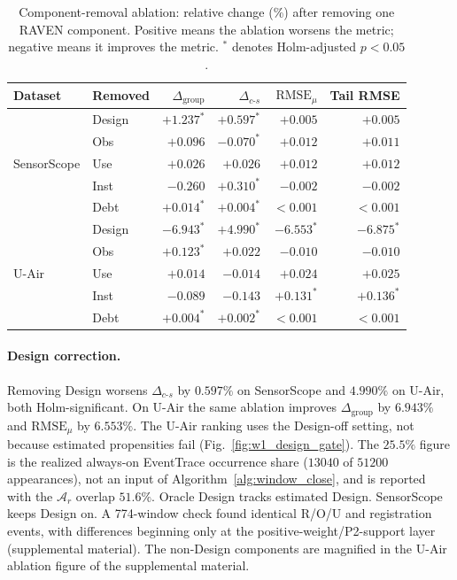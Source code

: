 \documentclass[letterpaper,journal]{IEEEtran}
\begin{document}
\begin{table}[!htbp]
\centering
\caption{Component-removal ablation: relative change (\%) after removing one RAVEN component.
Positive means the ablation worsens the metric; negative means it improves the
metric.  $^\ast$ denotes Holm-adjusted $p<0.05$.}
\label{tab:e4_ablation}
\setlength{\tabcolsep}{3.5pt}
\begin{tabular}{llrrrr}
\toprule
Dataset & Removed & $\Delta_{\mathrm{group}}$ &
$\Delta_{c\text{-}s}$ & $\mathrm{RMSE}_{\mu}$ & Tail RMSE\\
\midrule
\multirow{5}{*}{SensorScope}
& Design & $+1.237^\ast$ & $+0.597^\ast$ & $+0.005$ & $+0.005$\\
& Obs    & $+0.096$       & $-0.070^\ast$ & $+0.012$ & $+0.011$\\
& Use    & $+0.026$       & $+0.026$       & $+0.012$ & $+0.012$\\
& Inst   & $-0.260$       & $+0.310^\ast$ & $-0.002$ & $-0.002$\\
& Debt   & $+0.014^\ast$ & $+0.004^\ast$ & $<0.001$ & $<0.001$\\
\midrule
\multirow{5}{*}{U-Air}
& Design & $-6.943^\ast$ & $+4.990^\ast$ & $-6.553^\ast$ & $-6.875^\ast$\\
& Obs    & $+0.123^\ast$ & $+0.022$       & $-0.010$       & $-0.010$\\
& Use    & $+0.014$       & $-0.014$       & $+0.024$       & $+0.025$\\
& Inst   & $-0.089$       & $-0.143$       & $+0.131^\ast$ & $+0.136^\ast$\\
& Debt   & $+0.004^\ast$ & $+0.002^\ast$ & $<0.001$ & $<0.001$\\
\bottomrule
\end{tabular}
\end{table}

\paragraph{Design correction.}
Removing Design worsens $\Delta_{c\text{-}s}$ by $0.597\%$ on SensorScope and
$4.990\%$ on U-Air, both Holm-significant.  On U-Air the same ablation
improves $\Delta_{\mathrm{group}}$ by $6.943\%$ and
$\mathrm{RMSE}_{\mu}$ by $6.553\%$.  The U-Air ranking uses the Design-off
setting, not because estimated propensities fail
(Fig.~\ref{fig:w1_design_gate}).  The $25.5\%$ figure is the realized always-on
EventTrace occurrence share ($13040$ of $51200$ appearances), not an
input of Algorithm~\ref{alg:window_close}, and is reported with the $\mathcal{A}_r$ overlap
$51.6\%$.  Oracle Design tracks estimated
Design.  SensorScope keeps Design on.  A 774-window check found identical
R/O/U and registration events, with differences beginning only at the
positive-weight/P2-support layer
(supplemental material).
The non-Design components are magnified in the U-Air ablation figure of the supplemental material.
\end{document}
